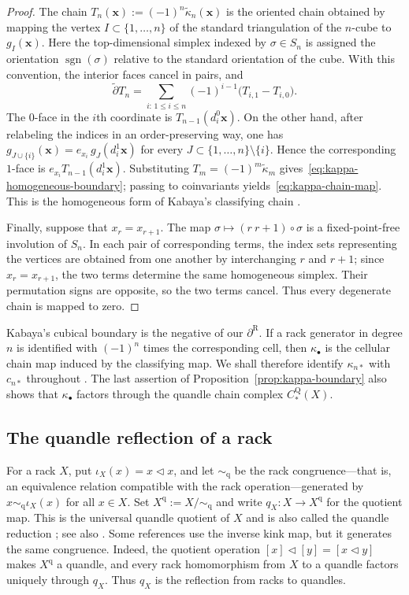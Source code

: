 \documentclass[10pt,a4paper]{amsart}
\DeclareMathOperator{\sgn}{sgn}
\newcommand{\td}{\widetilde\partial}
\newcommand{\R}{\mathrm R}
\newcommand{\Q}{\mathrm Q}
\begin{document}
\begin{proof}
The chain $T_n(\mathbf x):=(-1)^n\widetilde\kappa_n(\mathbf x)$ is the oriented chain obtained by mapping the vertex $I\subset\{1,\ldots,n\}$ of the standard triangulation of the $n$-cube to $g_I(\mathbf x)$. Here the top-dimensional simplex indexed by $\sigma\in S_n$ is assigned the orientation $\sgn(\sigma)$ relative to the standard orientation of the cube. With this convention, the interior faces cancel in pairs, and
\[
 \td T_n=\sum_{i:\,1\le i\le n}(-1)^{i-1}\bigl(T_{i,1}-T_{i,0}\bigr).
\]
The $0$-face in the $i$th coordinate is $T_{n-1}(d_i^0\mathbf x)$. On the other hand, after relabeling the indices in an order-preserving way, one has $g_{J\cup\{i\}}(\mathbf x)=e_{x_i}\,g_J(d_i^1\mathbf x)$ for every $J\subset\{1,\ldots,n\}\setminus\{i\}$. Hence the corresponding $1$-face is $e_{x_i}T_{n-1}(d_i^1\mathbf x)$. Substituting $T_m=(-1)^m\widetilde\kappa_m$ gives~\eqref{eq:kappa-homogeneous-boundary}; passing to coinvariants yields~\eqref{eq:kappa-chain-map}. This is the homogeneous form of Kabaya's classifying chain \cite[\S8.4]{Kabaya}.

Finally, suppose that $x_r=x_{r+1}$. The map
$\sigma\mapsto(r\ r+1)\circ\sigma$ is a fixed-point-free involution of $S_n$. In each pair of corresponding terms, the index sets representing the vertices are obtained from one another by interchanging $r$ and $r+1$; since $x_r=x_{r+1}$, the two terms determine the same homogeneous simplex. Their permutation signs are opposite, so the two terms cancel. Thus every degenerate chain is mapped to zero.
\end{proof}

Kabaya's cubical boundary is the negative of our $\partial^\R$. If a rack generator in degree $n$ is identified with $(-1)^n$ times the corresponding cell, then $\kappa_\bullet$ is the cellular chain map induced by the classifying map. We shall therefore identify $\kappa_{n*}$ with $c_{n*}$ throughout \cite[\S8.4]{Kabaya}. The last assertion of Proposition~\ref{prop:kappa-boundary} also shows that $\kappa_\bullet$ factors through the quandle chain complex $C_*^\Q(X)$.

\subsection{The quandle reflection of a rack}
\label{subsec:quandle-reflection}

For a rack $X$, put $\iota_X(x)=x\lhd x$, and let $\sim_{\mathrm q}$ be the rack congruence---that is, an equivalence relation compatible with the rack operation---generated by
$x\sim_{\mathrm q}\iota_X(x)$ for all $x\in X$. Set $X^{\mathrm q}:=X/{\sim_{\mathrm q}}$ and write $q_X\colon X\to X^{\mathrm q}$ for the quotient map. This is the universal quandle quotient of $X$ and is also called the quandle reduction
\cite{FennRourke}; see also \cite[Proposition~5.1]{TanakaTaniguchi}. Some references use the inverse kink map, but it generates the same congruence. Indeed, the quotient operation $[x]\lhd[y]=[x\lhd y]$ makes $X^{\mathrm q}$ a quandle, and every rack homomorphism from $X$ to a quandle factors uniquely through $q_X$. Thus $q_X$ is the reflection from racks to quandles.
\end{document}
